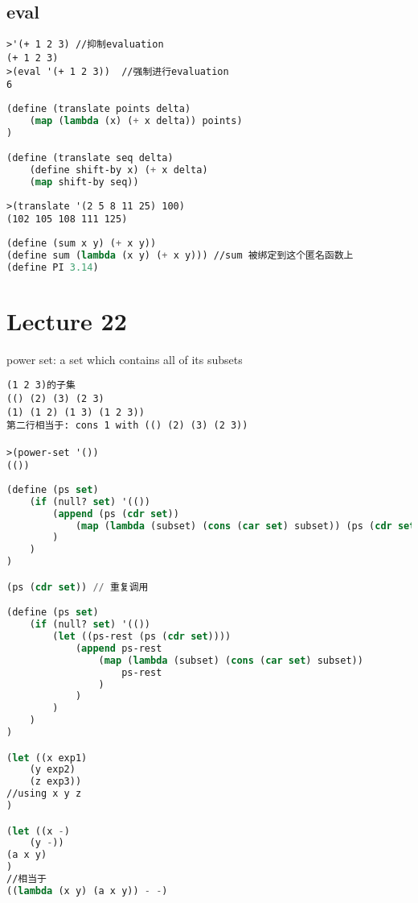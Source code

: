 \documentclass{article}
\begin{document}
\subsection{eval}
\begin{verbatim}
>'(+ 1 2 3) //抑制evaluation
(+ 1 2 3)
>(eval '(+ 1 2 3))  //强制进行evaluation
6
\end{verbatim}

\begin{lstlisting}[language = Lisp]
(define (translate points delta)
	(map (lambda (x) (+ x delta)) points)
)

(define (translate seq delta)
	(define shift-by x) (+ x delta)
	(map shift-by seq))
\end{lstlisting}

\begin{verbatim}
>(translate '(2 5 8 11 25) 100)
(102 105 108 111 125)
\end{verbatim}

\begin{lstlisting}[language = Lisp]
(define (sum x y) (+ x y))
(define sum (lambda (x y) (+ x y))) //sum 被绑定到这个匿名函数上
(define PI 3.14)
\end{lstlisting}

\section{Lecture 22}
power set: a set which contains all of its subsets
\begin{verbatim}
(1 2 3)的子集
(() (2) (3) (2 3)
(1) (1 2) (1 3) (1 2 3))
第二行相当于: cons 1 with (() (2) (3) (2 3))

>(power-set '())
(())
\end{verbatim}

\begin{lstlisting}[language = Lisp]
(define (ps set)
	(if (null? set) '(())
		(append (ps (cdr set))
			(map (lambda (subset) (cons (car set) subset)) (ps (cdr set)))
		)
	)
)

(ps (cdr set)) // 重复调用

(define (ps set)
	(if (null? set) '(())
		(let ((ps-rest (ps (cdr set))))
			(append ps-rest
				(map (lambda (subset) (cons (car set) subset))
					ps-rest
				)
			)
		)
	)
)

(let ((x exp1)
	(y exp2)
	(z exp3))
//using x y z
)

(let ((x -)
	(y -))
(a x y)
)
//相当于
((lambda (x y) (a x y)) - -)
\end{lstlisting}
\end{document}
